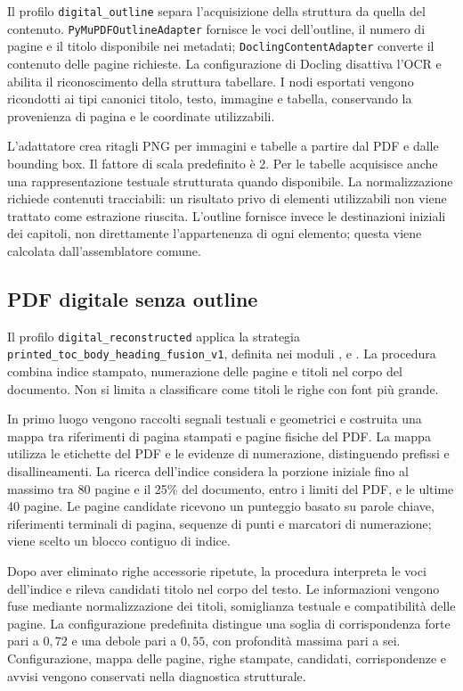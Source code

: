 Il profilo \texttt{digital\_outline} separa l'acquisizione della struttura da quella del contenuto. \texttt{PyMuPDFOutlineAdapter} fornisce le voci dell'outline, il numero di pagine e il titolo disponibile nei metadati; \texttt{DoclingContentAdapter} converte il contenuto delle pagine richieste. La configurazione di Docling disattiva l'OCR e abilita il riconoscimento della struttura tabellare. I nodi esportati vengono ricondotti ai tipi canonici titolo, testo, immagine e tabella, conservando la provenienza di pagina e le coordinate utilizzabili.

L'adattatore crea ritagli PNG per immagini e tabelle a partire dal PDF e dalle bounding box. Il fattore di scala predefinito è 2. Per le tabelle acquisisce anche una rappresentazione testuale strutturata quando disponibile. La normalizzazione richiede contenuti tracciabili: un risultato privo di elementi utilizzabili non viene trattato come estrazione riuscita. L'outline fornisce invece le destinazioni iniziali dei capitoli, non direttamente l'appartenenza di ogni elemento; questa viene calcolata dall'assemblatore comune.

\subsection{PDF digitale senza outline}

Il profilo \texttt{digital\_reconstructed} applica la strategia \texttt{printed\_toc\_body\_heading\_fusion\_v1}, definita nei moduli ,  e . La procedura combina indice stampato, numerazione delle pagine e titoli nel corpo del documento. Non si limita a classificare come titoli le righe con font più grande.

In primo luogo vengono raccolti segnali testuali e geometrici e costruita una mappa tra riferimenti di pagina stampati e pagine fisiche del PDF. La mappa utilizza le etichette del PDF e le evidenze di numerazione, distinguendo prefissi e disallineamenti. La ricerca dell'indice considera la porzione iniziale fino al massimo tra 80 pagine e il 25\% del documento, entro i limiti del PDF, e le ultime 40 pagine. Le pagine candidate ricevono un punteggio basato su parole chiave, riferimenti terminali di pagina, sequenze di punti e marcatori di numerazione; viene scelto un blocco contiguo di indice.

Dopo aver eliminato righe accessorie ripetute, la procedura interpreta le voci dell'indice e rileva candidati titolo nel corpo del testo. Le informazioni vengono fuse mediante normalizzazione dei titoli, somiglianza testuale e compatibilità delle pagine. La configurazione predefinita distingue una soglia di corrispondenza forte pari a $0{,}72$ e una debole pari a $0{,}55$, con profondità massima pari a sei. Configurazione, mappa delle pagine, righe stampate, candidati, corrispondenze e avvisi vengono conservati nella diagnostica strutturale.

